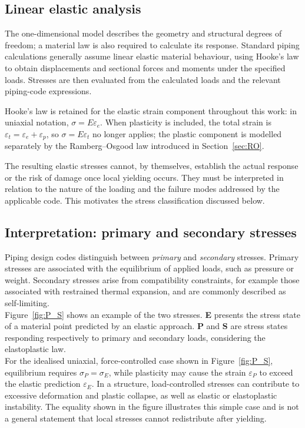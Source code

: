 \documentclass[10pt,a4paper]{article}
\begin{document}
\subsection{Linear elastic analysis}

The one-dimensional model describes the geometry and structural degrees of freedom; a material law is also required to calculate its response. Standard piping calculations generally assume linear elastic material behaviour, using Hooke's law to obtain displacements and sectional forces and moments under the specified loads. Stresses are then evaluated from the calculated loads and the relevant piping-code expressions.

Hooke's law is retained for the elastic strain component throughout this work: in uniaxial notation, $\sigma=E\varepsilon_e$. When plasticity is included, the total strain is $\varepsilon_t=\varepsilon_e+\varepsilon_p$, so $\sigma=E\varepsilon_t$ no longer applies; the plastic component is modelled separately by the Ramberg--Osgood law introduced in Section~\ref{sec:RO}.

The resulting elastic stresses cannot, by themselves, establish the actual response or the risk of damage once local yielding occurs. They must be interpreted in relation to the nature of the loading and the failure modes addressed by the applicable code. This motivates the stress classification discussed below.

\subsection{Interpretation: primary and secondary stresses}
\label{sec:standardApproach}

Piping design codes distinguish between \emph{primary} and \emph{secondary} stresses. Primary stresses are associated with the equilibrium of applied loads, such as pressure or weight. Secondary stresses arise from compatibility constraints, for example those associated with restrained thermal expansion, and are commonly described as self-limiting. \\
Figure~\ref{fig:P_S} shows an example of the two stresses.  \textbf{E} presents the stress state of a material point predicted by an elastic approach.  \textbf{P} and \textbf{S} are stress states responding respectively to primary and secondary loads, considering the elastoplastic law.\\
For the idealised uniaxial, force-controlled case shown in Figure~\ref{fig:P_S}, equilibrium requires $\sigma_P=\sigma_E$, while plasticity may cause the strain $\varepsilon_P$ to exceed the elastic prediction $\varepsilon_E$. In a structure, load-controlled stresses can contribute to excessive deformation and plastic collapse, as well as elastic or elastoplastic instability. The equality shown in the figure illustrates this simple case and is not a general statement that local stresses cannot redistribute after yielding.
\end{document}
